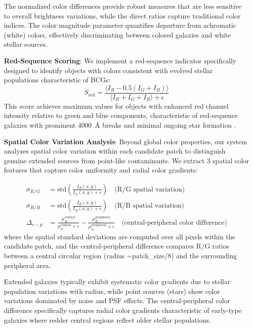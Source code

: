 \documentclass[twocolumn,10pt]{aastex631}
\begin{document}
The normalized color differences provide robust measures that are less sensitive to overall brightness variations, while the direct ratios capture traditional color indices. The color magnitude parameter quantifies departure from achromatic (white) colors, effectively discriminating between colored galaxies and white stellar sources.

\textbf{Red-Sequence Scoring}: We implement a red-sequence indicator specifically designed to identify objects with colors consistent with evolved stellar populations characteristic of BCGs:
\begin{equation}
S_{\text{red}} = \frac{\langle I_R - 0.5(I_G + I_B) \rangle}{\langle I_R + I_G + I_B \rangle + \epsilon}
\end{equation}
This score achieves maximum values for objects with enhanced red channel intensity relative to green and blue components, characteristic of red-sequence galaxies with prominent 4000~Å breaks and minimal ongoing star formation \citep{Kodama1997,Gladders2000}.

\textbf{Spatial Color Variation Analysis}: Beyond global color properties, our system analyzes spatial color variation within each candidate patch to distinguish genuine extended sources from point-like contaminants. We extract 3 spatial color features that capture color uniformity and radial color gradients:

\begin{align}
\sigma_{R/G} &= \text{std}\left(\frac{I_R(x,y)}{I_G(x,y) + \epsilon}\right) \quad \text{(R/G spatial variation)} \\
\sigma_{R/B} &= \text{std}\left(\frac{I_R(x,y)}{I_B(x,y) + \epsilon}\right) \quad \text{(R/B spatial variation)} \\
\Delta_{c-p} &= \frac{\mu_R^{\text{central}}}{\mu_G^{\text{central}} + \epsilon} - \frac{\mu_R^{\text{peripheral}}}{\mu_G^{\text{peripheral}} + \epsilon} \quad \text{(central-peripheral color difference)}
\end{align}
where the spatial standard deviations are computed over all pixels within the candidate patch, and the central-peripheral difference compares R/G ratios between a central circular region (radius $\sim$patch\_size/8) and the surrounding peripheral area.

Extended galaxies typically exhibit systematic color gradients due to stellar population variations with radius, while point sources (stars) show color variations dominated by noise and PSF effects. The central-peripheral color difference specifically captures radial color gradients characteristic of early-type galaxies where redder central regions reflect older stellar populations.
\end{document}
